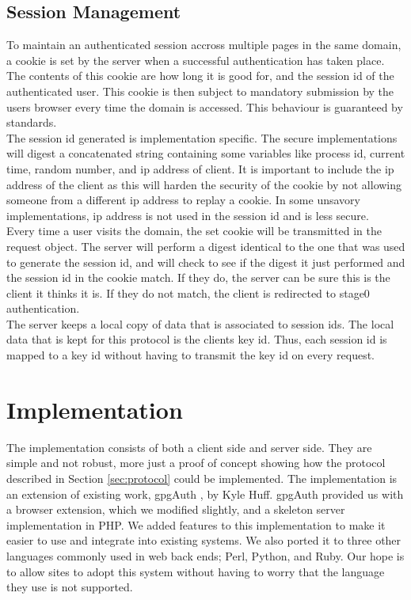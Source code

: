 \documentclass[11pt]{article}
\begin{document}
\subsection{Session Management} \label{sessionManagement}
To maintain an authenticated session accross multiple pages in the same domain, a cookie is set by the server when a successful authentication has taken place. The contents of this cookie are how long it is good for, and the session id of the authenticated user. This cookie is then subject to mandatory submission by the users browser every time the domain is accessed. This behaviour is guaranteed by standards. \\
The session id generated is implementation specific. The secure implementations will digest a concatenated string containing some variables like process id, current time, random number, and ip address of client. It is important to include the ip address of the client as this will harden the security of the cookie by not allowing someone from a different ip address to replay a cookie. In some unsavory implementations, ip address is not used in the session id and is less secure. \\
Every time a user visits the domain, the set cookie will be transmitted in the request object. The server will perform a digest identical to the one that was used to generate the session id, and will check to see if the digest it just performed and the session id in the cookie match. If they do, the server can be sure this is the client it thinks it is. If they do not match, the client is redirected to stage0 authentication. \\
The server keeps a local copy of data that is associated to session ids. The local data that is kept for this protocol is the clients key id. Thus, each session id is mapped to a key id without having to transmit the key id on every request. 


\section{Implementation} \label{sec:implementation}
The implementation consists of both a client side and server side. They are simple and not robust, more just a proof of concept showing how the protocol described in Section \ref{sec:protocol} could be implemented. The implementation is an extension of existing work, gpgAuth \cite{gpgauth}, by Kyle Huff. gpgAuth provided us with a browser extension, which we modified slightly, and a skeleton server implementation in PHP. We added features to this implementation to make it easier to use and integrate into existing systems. We also ported it to three other languages commonly used in web back ends; Perl, Python, and Ruby. Our hope is to allow sites to adopt this system without having to worry that the language they use is not supported. 
\end{document}
